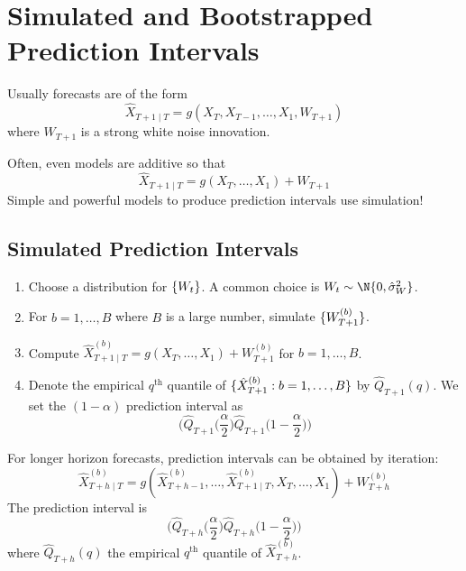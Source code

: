 \section{Simulated and Bootstrapped Prediction Intervals}
Usually forecasts are of the form
\[ \hat{X}_{T+1\mid T}=g(X_T,X_{T-1},\ldots,X_1,W_{T+1}) \]
where $ W_{T+1} $ is a strong white noise innovation.

Often, even models are additive so that
\[ \hat{X}_{T+1\mid T}=g(X_T,\ldots,X_1)+W_{T+1} \]
Simple and powerful models to produce prediction intervals
use simulation!
\subsection*{Simulated Prediction Intervals}
\begin{enumerate}[(1)]
      \item Choose a distribution for $ \{W_t\} $. A common choice is $ W_t \sim \N{0,\hat{\sigma}_W^2} $.
      \item For $ b=1,\ldots,B $ where $ B $ is a large number, simulate $ \{W_{T+1}^{(b)}\} $.
      \item Compute $ \hat{X}_{T+1\mid T}^{(b)}=g(X_{T},\ldots,X_1)+W_{T+1}^{(b)} $
            for $ b=1,\ldots,B $.
      \item Denote the empirical $ q^{\text{th}} $ quantile of $ \{\hat{X}_{T+1}^{(b)}:b=1,\ldots,B\} $
            by $ \hat{Q}_{T+1}(q) $. We set the $ (1-\alpha) $ prediction interval as
            \[ \biggl(\hat{Q}_{T+1}\biggl(\frac{\alpha}{2} \biggr)\hat{Q}_{T+1}\biggl(1-\frac{\alpha}{2} \biggr)\biggr) \]
\end{enumerate}
\begin{Remark}{}{}
      For longer horizon forecasts, prediction intervals can be obtained by iteration:
      \[ \hat{X}_{T+h\mid T}^{(b)}=g(\hat{X}_{T+h-1}^{(b)},\ldots,\hat{X}_{T+1\mid T}^{(b)},X_T,\ldots,X_1)+W_{T+h}^{(b)} \]
      The prediction interval is
      \[ \biggl(\hat{Q}_{T+h}\biggl(\frac{\alpha}{2} \biggr)\hat{Q}_{T+h}\biggl(1-\frac{\alpha}{2} \biggr)\biggr) \]
      where $ \hat{Q}_{T+h}(q) $ the empirical $ q^{\text{th}} $ quantile of $ \hat{X}_{T+h}^{(b)} $.
\end{Remark}
